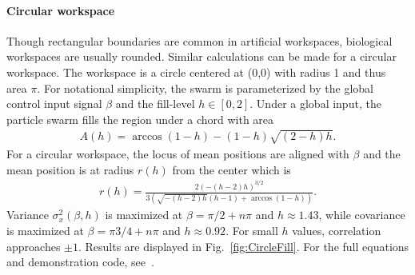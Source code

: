 \paragraph{Circular workspace}
Though rectangular boundaries are common in artificial workspaces, biological workspaces are usually rounded.
Similar calculations can be made for a circular workspace.  The workspace is a circle centered at (0,0) with radius 1 and thus area $\pi$.
For notational simplicity, the swarm is parameterized by the global control input signal $\beta$ and the fill-level $h\in[0,2]$.  
Under a global input, the particle swarm fills the region under a chord with area
\begin{align}
A(h) = \arccos(1-h)-(1-h) \sqrt{(2-h) h}.
\end{align}
For a circular workspace, the locus of mean positions are aligned with $\beta$ and the mean position is at radius $r(h)$ from the center which is
\begin{align}
r(h) = \frac{2 (-(h-2) h)^{3/2}}{3 \left(\sqrt{-(h-2) h} (h-1)+\arccos(1-h)\right)}.
\end{align}
Variance $\sigma^2_x(\beta,h)$ is maximized at $\beta = \pi/2+n \pi$ and $h\approx1.43$, while covariance is maximized at $\beta = \pi3/4+n \pi$ and $h\approx0.92.$ For small $h$ values, correlation approaches $\pm1$. Results are displayed in Fig.~\ref{fig:CircleFill}.  For the full equations and demonstration code, see~\cite{Haoran2016SwarminCircle}.%

%


